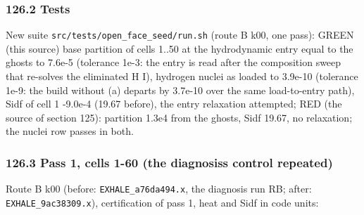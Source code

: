 \documentclass[english,a4paper]{my_memo}
\begin{document}
\subsubsection{126.2 Tests}\label{1262-tests}

New suite \texttt{src/tests/open\_face\_seed/run.sh} (route B k00, one pass): GREEN (this source) base partition of cells 1..50 at the hydrodynamic entry equal to the ghost\textquotesingle s to 7.6e-5 (tolerance 1e-3: the entry is read after the composition sweep that re-solves the eliminated H I), hydrogen nuclei as loaded to 3.9e-10 (tolerance 1e-9: the build without (a) departs by 3.7e-10 over the same load-to-entry path), Sidf of cell 1 -9.0e-4 (19.67 before), the entry relaxation attempted; RED (the source of section 125): partition 1.3e4 from the ghost\textquotesingle s, Sidf 19.67, no relaxation; the nuclei row passes in both.

\subsubsection{126.3 Pass 1, cells 1-60 (the diagnosis\textquotesingle s control repeated)}\label{1263-pass-1-cells-1-60-the-diagnosiss-control-repeated}

Route B k00 (before: \texttt{EXHALE\_a76da494.x}, the diagnosis run RB; after: \texttt{EXHALE\_9ac38309.x}), certification of pass 1, heat and Sidf in code units:
\end{document}

